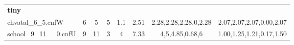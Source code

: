 \begin{table*}[t!]
{\begin{tabular}{lccccccc}
  \midrule
 {\bf tiny} &  &  &  &  &  &\\ 
 chvatal\_6\_5.cnfW & 6 & 5 & 5 & 1.1 & 2.51 & 2.28,2.28,2.28,0,2.28 & 2.07,2.07,2.07,0.00,2.07 \\ 
 school\_9\_11\_\_0.cnfU & 9 & 11 & 3 & 4 & 7.33 & 4,5,4.85,0.68,6 & 1.00,1.25,1.21,0.17,1.50 \\ 

\end{tabular}}
\end{table*}
